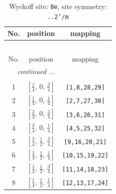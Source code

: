 \documentclass[fleqn,8pt]{jsarticle}
\begin{document}
\begin{longtable}{ccc}
\caption{Wyckoff site: {\tt 8e}, site symmetry: {\tt ..2'/m}}
 \\
 \hline \hline
No. & position & mapping \\ \hline \endfirsthead

\multicolumn{2}{l}{\tablename\ \thetable{}} \\
 \hline \hline
No. & position & mapping \\ \hline \endhead

 \hline \hline
\multicolumn{2}{r}{\footnotesize\it continued ...} \\ \endfoot

 \hline \hline
\multicolumn{2}{r}{} \\ \endlastfoot

1 & $\left[ \frac{1}{4},\, 0,\, \frac{3}{4} \right]$ & {\tt [1,8,28,29]} \\ \hline
2 & $\left[ \frac{1}{4},\, 0,\, \frac{1}{4} \right]$ & {\tt [2,7,27,30]} \\ \hline
3 & $\left[ \frac{3}{4},\, 0,\, \frac{3}{4} \right]$ & {\tt [3,6,26,31]} \\ \hline
4 & $\left[ \frac{3}{4},\, 0,\, \frac{1}{4} \right]$ & {\tt [4,5,25,32]} \\ \hline
5 & $\left[ \frac{3}{4},\, \frac{1}{2},\, \frac{3}{4} \right]$ & {\tt [9,16,20,21]} \\ \hline
6 & $\left[ \frac{3}{4},\, \frac{1}{2},\, \frac{1}{4} \right]$ & {\tt [10,15,19,22]} \\ \hline
7 & $\left[ \frac{1}{4},\, \frac{1}{2},\, \frac{3}{4} \right]$ & {\tt [11,14,18,23]} \\ \hline
8 & $\left[ \frac{1}{4},\, \frac{1}{2},\, \frac{1}{4} \right]$ & {\tt [12,13,17,24]} \\
\end{longtable}
\renewcommand{\arraystretch}{1.2}
\end{document}
